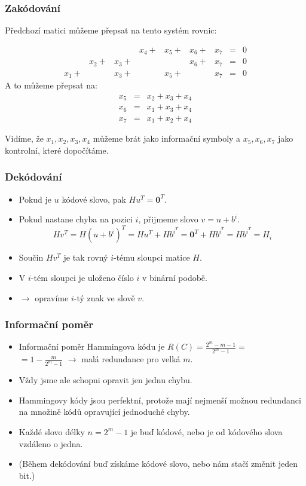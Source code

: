 \documentclass{beamer}
\newcommand{\zero}{\textbf{0}}
\newenvironment{itemizex}%
  {\large \begin{itemize}%
    \setlength{\itemsep}{8pt}%
    \setlength{\parskip}{8pt}}%
  {\end{itemize}}
\newenvironment{itemizey}%
  {\large \begin{itemize}%
    \setlength{\itemsep}{6pt}%
    \setlength{\parskip}{6pt}}%
  {\end{itemize}}
\begin{document}
\begin{frame}[t,fragile]\frametitle{Zakódování} 
Předchozí matici můžeme přepsat na tento systém rovnic:

$$
\begin{array}{ccccccccc}
&&&x_4+&x_5+&x_6+&x_7&=&0\\
&x_2+&x_3+&&&x_6+&x_7&=&0\\
x_1+&&x_3+&&x_5+&&x_7&=&0
\end{array}
$$
A to můžeme přepsat na:
\begin{eqnarray*}
x_5&=&x_2+x_3+x_4\\
x_6&=&x_1+x_3+x_4\\
x_7&=&x_1+x_2+x_4
\end{eqnarray*}

Vidíme, že $x_1, x_2, x_3, x_4$ můžeme brát jako informační symboly a $x_5, x_6, x_7$ jako kontrolní, které dopočítáme. 
\end{frame}



\begin{frame}[t,fragile]\frametitle{Dekódování} 
    \begin{itemizex}
        \item Pokud je $u$ kódové slovo, pak $Hu^T=\zero^T$. 
        \item Pokud nastane chyba na pozici $i$, přijmeme slovo $v=u+b^i$.
$$
Hv^T=H(u+b^i)^T=Hu^T+Hb^{i^T}=\zero^T+Hb^{i^T}=Hb^{i^T}=H_i
$$
        \item Součin $Hv^T$ je tak rovný $i$-tému sloupci matice $H$.
        \item V $i$-tém sloupci je uloženo číslo $i$ v binární podobě.
        \item $\longrightarrow$ opravíme $i$-tý znak ve slově $v$.
    \end{itemizex}
\end{frame}



\begin{frame}[t,fragile]\frametitle{Informační poměr} 
    \begin{itemizey}
        \item Informační poměr Hammingova kódu je $R(C)=\frac{2^m-m-1}{2^m-1}=$\\$=1-\frac{m}{2^m-1}$ $\longrightarrow$ malá redundance pro velká $m$.
        \item Vždy jsme ale schopni opravit jen jednu chybu.
        \item Hammingovy kódy jsou perfektní, protože mají nejmenší možnou redundanci na množině kódů opravující jednoduché chyby.
        \item Každé slovo délky $n=2^m-1$ je buď kódové, nebo je od kódového slova vzdáleno o jedna.
        \item (Během dekódování buď získáme kódové slovo, nebo nám stačí změnit jeden bit.)
    \end{itemizey}
\end{frame}
\end{document}
